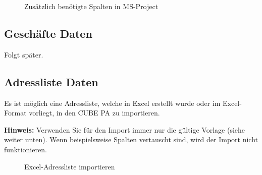 \begin{figure}[H]
\caption{Zusätzlich benötigte Spalten in MS-Project}
\end{figure}

\subsection{Geschäfte Daten}

Folgt später.

\subsection{Adressliste Daten}

Es ist möglich eine Adressliste, welche in Excel erstellt wurde oder im Excel-Format vorliegt, in den CUBE PA zu importieren. 

\vspace{\baselineskip}

\textbf{Hinweis:} Verwenden Sie für den Import immer nur die gültige Vorlage (siehe weiter unten). Wenn beispielsweise Spalten vertauscht sind, wird der Import nicht funktionieren.

\begin{figure}[H]
\caption{Excel-Adressliste importieren}
\end{figure}

